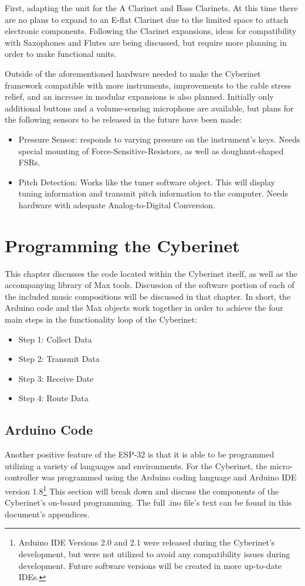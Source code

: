 First, adapting the unit for the A Clarinet and Bass Clarinets. At this time there are no plans to expand to an E-flat Clarinet due to the limited space to attach electronic components. Following the Clarinet expansions, ideas for compatibility with Saxophones and Flutes are being discussed, but require more planning in order to make functional units.

Outside of the aforementioned hardware needed to make the Cyberinet framework compatible with more instruments, improvements to the cable stress relief, and an increase in modular expansions is also planned. Initially only additional buttons and a volume-sensing microphone are available, but plans for the following sensors to be released in the future have been made:

\begin{itemize}
    \item Pressure Sensor: responds to varying pressure on the instrument's keys. Needs special mounting of Force-Sensitive-Resistors, as well as doughnut-shaped FSRs.
    \item Pitch Detection: Works like the tuner software object. This will display tuning information and transmit pitch information to the computer. Needs hardware with adequate Analog-to-Digital Conversion.
\end{itemize}


\chapter{Programming the Cyberinet}
This chapter discusses the code located within the Cyberinet itself, as well as the accompanying library of Max tools. Discussion of the software portion of each of the included music compositions will be discussed in that chapter. In short, the Arduino code and the Max objects work together in order to achieve the four main steps in the functionality loop of the Cyberinet:

\begin{itemize}
    \item Step 1: Collect Data
    \item Step 2: Transmit Data
    \item Step 3: Receive Date
    \item Step 4: Route Data
\end{itemize}

\section{Arduino Code}
Another positive feature of the ESP-32 is that it is able to be programmed utilizing a variety of languages and environments. For the Cyberinet, the micro-controller was programmed using the Arduino coding language and Arduino IDE version 1.8\footnote{Arduino IDE Versions 2.0 and 2.1 were released during the Cyberinet's development, but were not utilized to avoid any compatibility issues during development. Future software versions will be created in more up-to-date IDEs.} This section will break down and discuss the components of the Cyberinet's on-board programming. The full .ino file's text can be found in this document's appendices.

